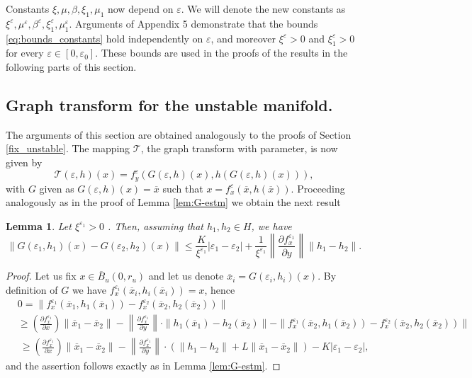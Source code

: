 \documentclass[11pt, leqno]{amsart}
\newtheorem{lem}[thm]{Lemma}
\theoremstyle{definition}
\begin{document}
Constants $\xi, \mu, \beta, \xi_1, \mu_1$ now depend on $\varepsilon$. We will denote the new constants as $\xi^\varepsilon, \mu^\varepsilon, \beta^\varepsilon, \xi_1^\varepsilon, \mu_1^\varepsilon$. Arguments of Appendix 5 demonstrate that the bounds \eqref{eq:bounds_constants} hold independently on $\varepsilon$, and moreover $\xi^\varepsilon >0$ and $\xi_1^{\varepsilon}>0$ for every $\varepsilon\in [0,\varepsilon_0]$. These bounds are used in the proofs of the results in the following parts of this section.

\subsection{Graph transform for the unstable manifold.}
The arguments of this section are obtained analogously to the proofs of Section \ref{fix_unstable}.
The mapping $\mathcal{T}$, the graph transform with parameter, is now given by
\begin{equation}
	\mathcal{T}(\varepsilon,h) (x) = f^\varepsilon_y(G(\varepsilon,h)(x),h(G(\varepsilon,h)(x))),  \label{eq:TGe}
\end{equation}
with $G$ given as $G(\varepsilon,h)(x) = \overline{x}$ such that $x = f^\varepsilon_x(\overline{x},h(\overline{x}))$. Proceeding analogously as in the proof of Lemma \ref{lem:G-estm} we obtain the next result
\begin{lem}
	\label{lem:G-estm_e}
	Let $\xi^{\varepsilon_1}>0$ . Then, assuming that $h_1,h_2 \in H$, we have
	\begin{equation}
		\|G(\varepsilon_1,h_1)(x) - G(\varepsilon_2,h_2)(x)\| \leq \frac{K}{\xi^{\varepsilon_1}}|\varepsilon_1-\varepsilon_2| +      \frac{1}{\xi^{\varepsilon_1}} \left\| \frac{\partial f^{\varepsilon_1}_x}{\partial y}  \right\|  \|h_1 - h_2\|.
	\end{equation}
\end{lem}
\begin{proof}
Let us fix $x \in \overline{B}_u(0,r_u)$ and  let us denote $\overline{x}_i=G(\varepsilon_i,h_i)(x)$.  By definition of $G$ we have $f^{\varepsilon_i}_x(\overline{x}_i,h_i(\overline{x}_i))=x$, hence
\begin{align*}
	& 0= \|f_x^{\varepsilon_1}(\overline{x}_1,h_1(\overline{x}_1)) - f^{\varepsilon_2}_x(\overline{x}_2,h_2(\overline{x}_2))\|\\
	&\geq  \left(\frac{\partial f^{\varepsilon_1}_x}{\partial x}\right) \|\overline{x}_1 - \overline{x}_2\| - \left\| \frac{\partial f^{\varepsilon_1}_x}{\partial y}  \right\| \cdot \|h_1(\overline{x}_1) - h_2(\overline{x}_2)\|-\|f_x^{\varepsilon_1}(\overline{x}_2,h_1(\overline{x}_2)) - f^{\varepsilon_2}_x(\overline{x}_2,h_2(\overline{x}_2))\|\\
	& \ \geq \left(\frac{\partial f^{\varepsilon_1}_x}{\partial x}\right) \|\overline{x}_1 - \overline{x}_2\| - \left\| \frac{\partial f^{\varepsilon_1}_x}{\partial y}  \right\| \cdot (\|h_1-h_2\|+L\|\overline{x}_1-\overline{x}_2\|)-K|\varepsilon_1-\varepsilon_2|,
\end{align*}
and the assertion follows exactly as in Lemma \ref{lem:G-estm}.
\end{proof}
\end{document}
